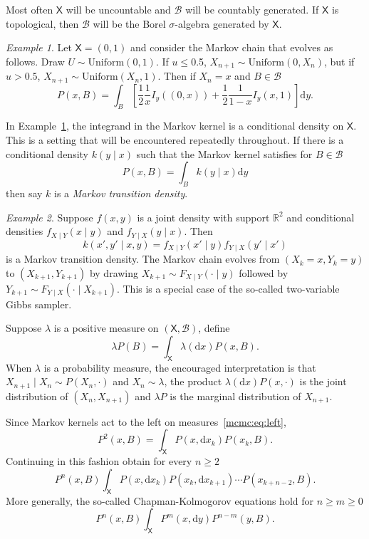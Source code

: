 \documentclass[12pt]{article}
\theoremstyle{plain}
\theoremstyle{definition}
\theoremstyle{remark}
\newtheorem{example}{Example}[section]
\newcommand{\df}{\mathrm{d}}
\newcommand{\X}{\mathsf{X}}
\newcommand{\B}{\mathcal{B}}
\begin{document}
Most often $\X$ will be uncountable and $\B$ will be countably
generated.  If $\X$ is topological, then $\B$ will be the Borel
$\sigma$-algebra generated by $\X$.

\begin{example}
  \label{mcmc:ex:betawalk}
 Let $\X  = (0,1)$ and consider the Markov chain that evolves as
 follows. Draw $U \sim \text{Uniform}(0,1)$.  If $u \le 0.$5, $X_{n+1}
 \sim \text{Uniform}(0, X_n)$, but if $u > 0.5$, $X_{n+1}
 \sim \text{Uniform}(X_n, 1)$.  Then if $X_n = x$ and $B \in \B$
 \[
P(x, B) = \int_{B} \left[ \frac{1}{2} \frac{1}{x} I_{y}((0,x)) +
  \frac{1}{2} \frac{1}{1-x} I_{y}(x,1) \right] \df y .
 \]
\end{example}

In Example~\ref{mcmc:ex:betawalk}, the integrand in the Markov kernel
is a conditional density on $\X$.  This is a setting that will be
encountered repeatedly throughout.  If there is a conditional density
$k (y \mid x)$ such that the Markov kernel satisfies for $B \in \B$
\[
P(x, B) = \int_{B} k(y \mid x) \df y
\]
then say $k$ is a {\em Markov transition density}.

\begin{example}
  \label{mcmc:ex:2varGS}
Suppose $f(x,y)$ is a joint density with support $\mathbb{R}^2$ and
conditional densities $f_{X \mid Y}(x \mid y)$ and $f_{Y \mid X}(y
\mid x)$.  Then
\[
  k(x', y' \mid x, y) = f_{X \mid Y}(x' \mid y) f_{Y \mid X}(y' \mid x')
\]
is a Markov transition density.  The Markov chain evolves from
$(X_k = x, Y_k =y)$ to $(X_{k+1}, Y_{k+1})$ by drawing
$X_{k+1} \sim F_{X \mid Y} (\cdot \mid y)$ followed by
$Y_{k+1} \sim F_{Y \mid X}(\cdot \mid X_{k+1})$.  This is a special
case of the so-called two-variable Gibbs sampler.
\end{example}


Suppose $\lambda$ is a positive measure on $(\X, \B)$,  define
\begin{equation}
  \label{mcmc:eq:left}
\lambda P(B) = \int_{\X} \lambda(\df x) P(x, B) .
\end{equation}
When $\lambda$ is a probability measure, the encouraged interpretation
is that $X_{n+1} \mid X_{n} \sim P(X_{n}, \cdot)$ and
$X_{n} \sim \lambda$, the product $\lambda(\df x) P(x, \cdot)$ is the
joint distribution of $(X_n, X_{n+1})$ and $\lambda P$ is the marginal
distribution of $X_{n+1}$.

Since Markov kernels act to the left on measures~\eqref{mcmc:eq:left},
\[
P^2(x, B) = \int_{\X} P(x, \df x_k) P(x_k, B) .
\]
Continuing in this fashion obtain for every $n \ge 2$
\[
P^n(x, B) \int_{\X} P(x, \df x_k) P(x_k, \df x_{k+1}) \cdots P(x_{k +
  n -2}, B) .
\]
More generally, the so-called Chapman-Kolmogorov equations hold for $n
\ge m \ge 0$
\[
P^n(x, B) \int_{\X} P^m(x, \df y) P^{n-m} (y, B) .
\]
\end{document}
